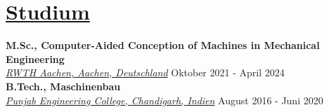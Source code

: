 \section{\underline{Studium}}

\large\textbf{M.Sc., Computer-Aided Conception of Machines in Mechanical Engineering}
\hfill\mastersgrade\\
\large\href{https://www.rwth-aachen.de/go/id/a/?lidx=1}{\emph{RWTH Aachen, Aachen, Deutschland}}
\hfill Oktober 2021 - April 2024\\

\large\textbf{B.Tech., Maschinenbau}
\hfill\cgpa\\
\large\href{https://pec.ac.in/}{\emph{Punjab Engineering College, Chandigarh, Indien}}
\hfill August 2016 - Juni 2020\\
\vspace{-1.5 em}